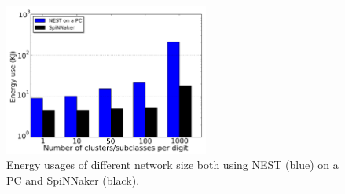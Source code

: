 \begin{figure}[hbt!]
	\centering
	\includegraphics[width=0.6\textwidth]{pics_bench/fig8.jpg}
	\caption{Energy usages of different network size both using NEST (blue) on a PC and SpiNNaker (black).}
	\label{fig:energy}
\end{figure}
%
%
%
%
